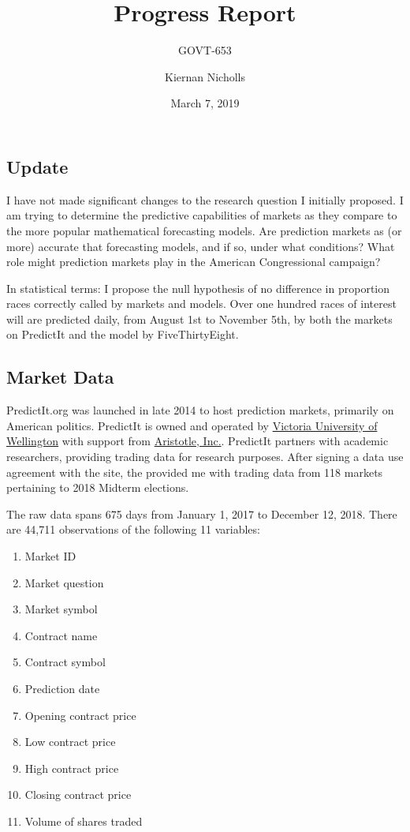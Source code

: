\documentclass[]{article}
\title{Progress Report}
\subtitle{GOVT-653}
\author{Kiernan Nicholls}
\date{March 7, 2019}
\providecommand{\tightlist}{%
  \setlength{\itemsep}{0pt}\setlength{\parskip}{0pt}}
\begin{document}
\maketitle

\subsection{Update}\label{update}

I have not made significant changes to the research question I initially
proposed. I am trying to determine the predictive capabilities of
markets as they compare to the more popular mathematical forecasting
models. Are prediction markets as (or more) accurate that forecasting
models, and if so, under what conditions? What role might prediction
markets play in the American Congressional campaign?

In statistical terms: I propose the null hypothesis of no difference in
proportion races correctly called by markets and models. Over one
hundred races of interest will are predicted daily, from August 1st to
November 5th, by both the markets on PredictIt and the model by
FiveThirtyEight.

\subsection{Market Data}\label{market-data}

PredictIt.org was launched in late 2014 to host prediction markets,
primarily on American politics. PredictIt is owned and operated by
\href{https://www.victoria.ac.nz/}{Victoria University of Wellington}
with support from \href{http://aristotle.com/}{Aristotle, Inc.}.
PredictIt partners with academic researchers, providing trading data for
research purposes. After signing a data use agreement with the site, the
provided me with trading data from 118 markets pertaining to 2018
Midterm elections.

The raw data spans 675 days from January 1, 2017 to December 12, 2018.
There are 44,711 observations of the following 11 variables:

\begin{enumerate}
\def\labelenumi{\arabic{enumi}.}
\tightlist
\item
  Market ID
\item
  Market question
\item
  Market symbol
\item
  Contract name
\item
  Contract symbol
\item
  Prediction date
\item
  Opening contract price
\item
  Low contract price
\item
  High contract price
\item
  Closing contract price
\item
  Volume of shares traded
\end{enumerate}
\end{document}
